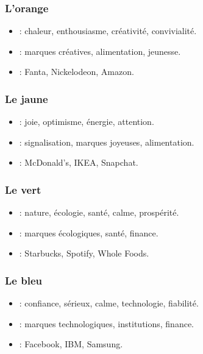 \subsubsection{L'orange}

\begin{itemize}
    \item {} : chaleur, enthousiasme, créativité, convivialité.
    \item {} : marques créatives, alimentation, jeunesse.
    \item {} : Fanta, Nickelodeon, Amazon.
\end{itemize}

\subsubsection{Le jaune}

\begin{itemize}
    \item {} : joie, optimisme, énergie, attention.
    \item {} : signalisation, marques joyeuses, alimentation.
    \item {} : McDonald's, IKEA, Snapchat.
\end{itemize}

\subsubsection{Le vert}

\begin{itemize}
    \item {} : nature, écologie, santé, calme, prospérité.
    \item {} : marques écologiques, santé, finance.
    \item {} : Starbucks, Spotify, Whole Foods.
\end{itemize}

\subsubsection{Le bleu}

\begin{itemize}
    \item {} : confiance, sérieux, calme, technologie, fiabilité.
    \item {} : marques technologiques, institutions, finance.
    \item {} : Facebook, IBM, Samsung.
\end{itemize}

